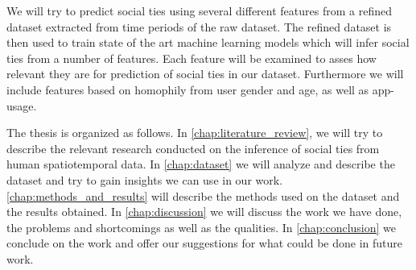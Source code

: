 We will try to predict social ties using several different features from a refined dataset extracted from time periods of the raw dataset. The refined dataset is then used to train state of the art machine learning models which will infer social ties from a number of features. Each feature will be examined to asses how relevant they are for prediction of social ties in our dataset. Furthermore we will include features based on homophily\cite{mcpherson2001birds} from user gender and age, as well as app-usage.

The thesis is organized as follows. In \autoref{chap:literature_review}, we will try to describe the relevant research conducted on the inference of social ties from human spatiotemporal data. In \autoref{chap:dataset} we will analyze and describe the dataset and try to gain insights we can use in our work. \autoref{chap:methods_and_results} will describe the methods used on the dataset and the results obtained. In \autoref{chap:discussion} we will discuss the work we have done, the problems and shortcomings as well as the qualities. In \autoref{chap:conclusion} we conclude on the work and offer our suggestions for what could be done in future work.


